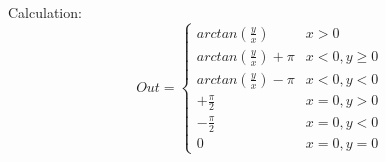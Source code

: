 Calculation:
\begin{equation*}
	Out = \begin{cases}
			arctan\left(\frac{y}{x}\right) & x > 0 \\
			arctan\left(\frac{y}{x}\right)+\pi & x < 0, y \ge 0 \\
			arctan\left(\frac{y}{x}\right)-\pi & x < 0, y < 0 \\
			+\frac{\pi}{2} & x = 0, y > 0\\
			-\frac{\pi}{2}  & x = 0, y < 0 \\
			0 & x = 0, y = 0
		  \end{cases}
\end{equation*}
